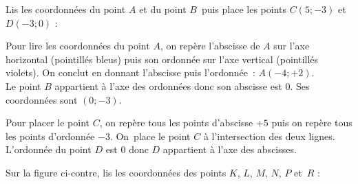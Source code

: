 \vspace{3em}

\begin{methode*1}

\begin{exemple*1}
Lis les coordonnées du point $A$ et du point $B$ puis place les points $C(5 ; -3)$ et $D(-3 ; 0)$ :

\begin{center} 
\end{center}

Pour lire les coordonnées du point $A$, on repère l'abscisse de $A$ sur l'axe horizontal (pointillés bleus) puis  son ordonnée sur l'axe vertical (pointillés violets). On conclut en donnant l'abscisse puis l'ordonnée : $A (-4 ; +2)$. \\[0.5em]
Le point $B$ appartient à l'axe des ordonnées donc son abscisse est 0. Ses coordonnées sont $(0 ; -3)$.

Pour placer le point $C$, on repère tous les points d'abscisse $+5$ puis on repère tous les points d'ordonnée $-3$. On place le point $C$ à l'intersection des deux lignes. \\[0.5em]
L'ordonnée du point $D$ est 0 donc $D$ appartient à l'axe des abscisses.
\end{exemple*1}

\exercice 

\begin{minipage}[c]{0.45\linewidth}
Sur la figure ci-contre, lis les coordonnées des points $K$, $L$, $M$, $N$, $P$ et $R$ :
 \end{minipage} \hfill%
 \begin{minipage}[c]{0.4\linewidth}
 \begin{center} 
\end{center}
\end{minipage}
\end{methode*1}
